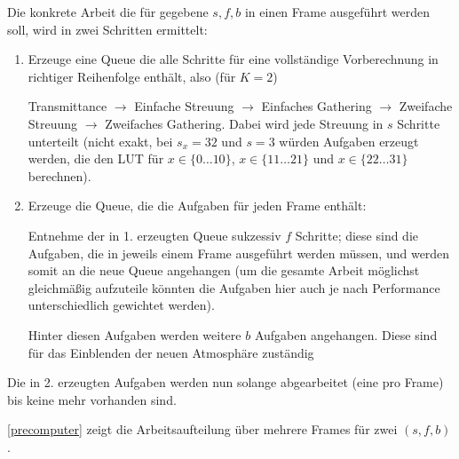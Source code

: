 Die konkrete Arbeit die für gegebene $s,f,b$ in einen Frame ausgeführt werden soll, wird in zwei Schritten ermittelt:
\begin{enumerate}
	\item Erzeuge eine Queue die alle Schritte für eine vollständige Vorberechnung in richtiger Reihenfolge enthält,
	also (für $K=2$)

	Transmittance $\rightarrow$ Einfache Streuung $\rightarrow$ Einfaches Gathering $\rightarrow$ Zweifache Streuung
	$\rightarrow$ Zweifaches Gathering. Dabei wird jede Streuung in $s$ Schritte unterteilt (nicht exakt, bei $s_x=32$
	und $s=3$ würden Aufgaben erzeugt werden, die den LUT für $x \in \{0 \dots 10\}$, $x \in \{11 \dots 21\}$ und $x \in
	\{22 \dots 31\}$ berechnen).

	\item Erzeuge die Queue, die die Aufgaben für jeden Frame enthält:

	Entnehme der in 1. erzeugten Queue sukzessiv $f$ Schritte; diese sind die Aufgaben, die in jeweils einem Frame
	ausgeführt werden müssen, und werden somit an die neue Queue angehangen (um die gesamte Arbeit möglichst gleichmäßig
	aufzuteile könnten die Aufgaben hier auch je nach Performance unterschiedlich gewichtet werden).

	Hinter diesen Aufgaben werden weitere $b$ Aufgaben angehangen. Diese sind für das Einblenden der neuen Atmosphäre
	zuständig
\end{enumerate}

Die in 2. erzeugten Aufgaben werden nun solange abgearbeitet (eine pro Frame) bis keine mehr vorhanden sind.

\cref{precomputer} zeigt die Arbeitsaufteilung über mehrere Frames für zwei $(s,f,b)$.

